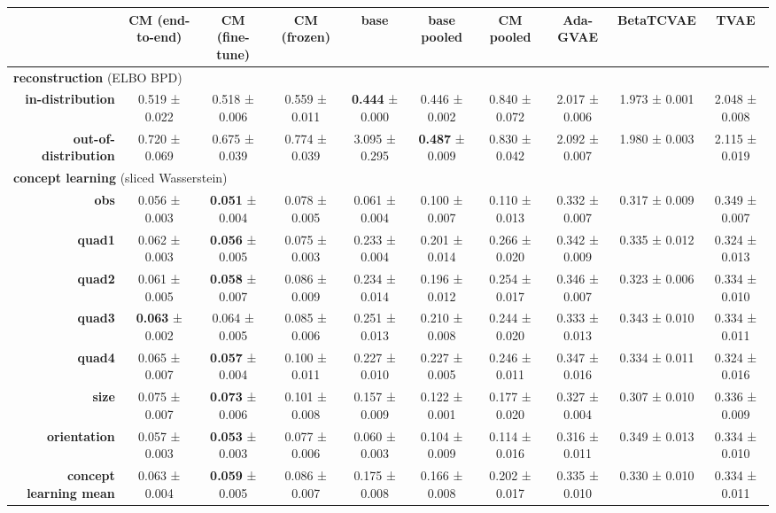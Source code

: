 \begin{tabular}{rccccccccc}
\toprule
& \textbf{CM (end-to-end)} & \textbf{CM (fine-tune)} & \textbf{CM (frozen)} & \textbf{base} & \textbf{base pooled} & \textbf{CM pooled} & \textbf{Ada-GVAE} & \textbf{BetaTCVAE} & \textbf{TVAE} \\
\midrule
\multicolumn{ 10 }{l}{\textbf{reconstruction}  (ELBO BPD)} \\
\midrule
\textbf{in-distribution} & 0.519 ± 0.022 & 0.518 ± 0.006 & 0.559 ± 0.011 & \textbf{0.444} ± 0.000 & 0.446 ± 0.002 & 0.840 ± 0.072 & 2.017 ± 0.006 & 1.973 ± 0.001 & 2.048 ± 0.008 \\
\textbf{out-of-distribution} & 0.720 ± 0.069 & 0.675 ± 0.039 & 0.774 ± 0.039 & 3.095 ± 0.295 & \textbf{0.487} ± 0.009 & 0.830 ± 0.042 & 2.092 ± 0.007 & 1.980 ± 0.003 & 2.115 ± 0.019 \\
\midrule
\multicolumn{ 10 }{l}{\textbf{concept learning}  (sliced Wasserstein)} \\
\midrule
\textbf{obs} & 0.056 ± 0.003 & \textbf{0.051} ± 0.004 & 0.078 ± 0.005 & 0.061 ± 0.004 & 0.100 ± 0.007 & 0.110 ± 0.013 & 0.332 ± 0.007 & 0.317 ± 0.009 & 0.349 ± 0.007 \\
\textbf{quad1} & 0.062 ± 0.003 & \textbf{0.056} ± 0.005 & 0.075 ± 0.003 & 0.233 ± 0.004 & 0.201 ± 0.014 & 0.266 ± 0.020 & 0.342 ± 0.009 & 0.335 ± 0.012 & 0.324 ± 0.013 \\
\textbf{quad2} & 0.061 ± 0.005 & \textbf{0.058} ± 0.007 & 0.086 ± 0.009 & 0.234 ± 0.014 & 0.196 ± 0.012 & 0.254 ± 0.017 & 0.346 ± 0.007 & 0.323 ± 0.006 & 0.334 ± 0.010 \\
\textbf{quad3} & \textbf{0.063} ± 0.002 & 0.064 ± 0.005 & 0.085 ± 0.006 & 0.251 ± 0.013 & 0.210 ± 0.008 & 0.244 ± 0.020 & 0.333 ± 0.013 & 0.343 ± 0.010 & 0.334 ± 0.011 \\
\textbf{quad4} & 0.065 ± 0.007 & \textbf{0.057} ± 0.004 & 0.100 ± 0.011 & 0.227 ± 0.010 & 0.227 ± 0.005 & 0.246 ± 0.011 & 0.347 ± 0.016 & 0.334 ± 0.011 & 0.324 ± 0.016 \\
\textbf{size} & 0.075 ± 0.007 & \textbf{0.073} ± 0.006 & 0.101 ± 0.008 & 0.157 ± 0.009 & 0.122 ± 0.001 & 0.177 ± 0.020 & 0.327 ± 0.004 & 0.307 ± 0.010 & 0.336 ± 0.009 \\
\textbf{orientation} & 0.057 ± 0.003 & \textbf{0.053} ± 0.003 & 0.077 ± 0.006 & 0.060 ± 0.003 & 0.104 ± 0.009 & 0.114 ± 0.016 & 0.316 ± 0.011 & 0.349 ± 0.013 & 0.334 ± 0.010 \\
\addlinespace
\textbf{concept learning mean} & 0.063 ± 0.004 & \textbf{0.059} ± 0.005 & 0.086 ± 0.007 & 0.175 ± 0.008 & 0.166 ± 0.008 & 0.202 ± 0.017 & 0.335 ± 0.010 & 0.330 ± 0.010 & 0.334 ± 0.011 \\

\end{tabular}
